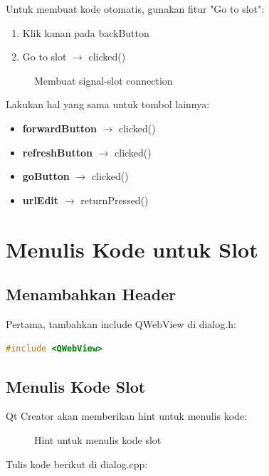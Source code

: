 Untuk membuat kode otomatis, gunakan fitur "Go to slot":

\begin{enumerate}
\item Klik kanan pada backButton
\item Go to slot $\rightarrow$ clicked()
\end{enumerate}

\begin{figure}[htbp]
\centering
{}
\caption{Membuat signal-slot connection}
\end{figure}

Lakukan hal yang sama untuk tombol lainnya:
\begin{itemize}
\item \textbf{forwardButton} $\rightarrow$ clicked()
\item \textbf{refreshButton} $\rightarrow$ clicked()
\item \textbf{goButton} $\rightarrow$ clicked()
\item \textbf{urlEdit} $\rightarrow$ returnPressed()
\end{itemize}

\section{Menulis Kode untuk Slot}

\subsection{Menambahkan Header}

Pertama, tambahkan include QWebView di dialog.h:

\begin{lstlisting}[language=c++]
#include <QWebView>
\end{lstlisting}

\subsection{Menulis Kode Slot}

Qt Creator akan memberikan hint untuk menulis kode:

\begin{figure}[htbp]
\centering
{}
\caption{Hint untuk menulis kode slot}
\end{figure}

Tulis kode berikut di dialog.cpp:

